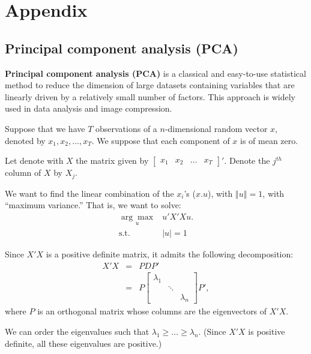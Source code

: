 \documentclass[
  12pt,
]{book}
\theoremstyle{definition}
\theoremstyle{definition}
\theoremstyle{definition}
\theoremstyle{definition}
\theoremstyle{remark}
\begin{document}
\hypertarget{append}{%
\chapter{Appendix}\label{append}}

\hypertarget{PCAapp}{%
\section{Principal component analysis (PCA)}\label{PCAapp}}

\textbf{Principal component analysis (PCA)} is a classical and easy-to-use statistical method to reduce the dimension of large datasets containing variables that are linearly driven by a relatively small number of factors. This approach is widely used in data analysis and image compression.

Suppose that we have \(T\) observations of a \(n\)-dimensional random vector \(x\), denoted by \(x_{1},x_{2},\ldots,x_{T}\). We suppose that each component of \(x\) is of mean zero.

Let denote with \(X\) the matrix given by \(\left[\begin{array}{cccc} x_{1} & x_{2} & \ldots & x_{T}\end{array}\right]'\). Denote the \(j^{th}\) column of \(X\) by \(X_{j}\).

We want to find the linear combination of the \(x_{i}\)'s (\(x.u\)), with \(\left\Vert u\right\Vert =1\), with ``maximum variance.'' That is, we want to solve:
\begin{equation}
\begin{array}{clll}
\underset{u}{\arg\max} & u'X'Xu. \\
\mbox{s.t. } & \left| u\right| =1
\end{array}\label{eq:PCA11}
\end{equation}

Since \(X'X\) is a positive definite matrix, it admits the following decomposition:
\begin{eqnarray*}
X'X & = & PDP'\\
& = & P\left[\begin{array}{ccc}
\lambda_{1}\\
& \ddots\\
&  & \lambda_{n}
\end{array}\right]P',
\end{eqnarray*}
where \(P\) is an orthogonal matrix whose columns are the eigenvectors of \(X'X\).

We can order the eigenvalues such that \(\lambda_{1}\geq\ldots\geq\lambda_{n}\). (Since \(X'X\) is positive definite, all these eigenvalues are positive.)
\end{document}
